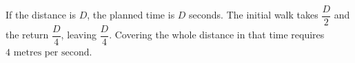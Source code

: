 If the distance is $D$, the planned time is $D$ seconds. The initial walk takes $\dfrac{D}{2}$ and the return $\dfrac{D}{4}$, leaving $\dfrac{D}{4}$. Covering the whole distance in that time requires $\boxed{4\text{ metres per second}}$.
